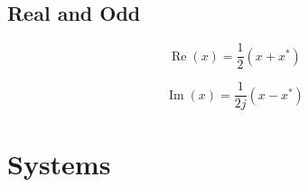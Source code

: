 \documentclass{article}
\begin{document}
\subsection{Real and Odd}
\begin{definition}
    \begin{equation*}
        \operatorname{Re}(x) = \frac{1}{2}(x + x^*)
    \end{equation*}
    
    \begin{equation*}
        \operatorname{Im}(x) = \frac{1}{2j}(x - x^*)
    \end{equation*}
\end{definition}

\section{Systems}
\begin{definition}

\end{definition}
\end{document}
